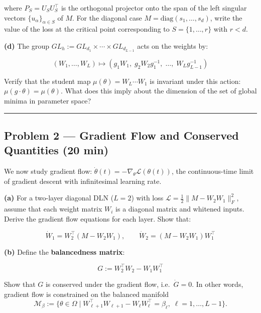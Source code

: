 \documentclass[
]{article}
\begin{document}
where \(P_S = U_S U_S^\top\) is the orthogonal projector onto the span
of the left singular vectors \(\{u_\alpha\}_{\alpha \in S}\) of \(M\).
For the diagonal case \(M = \text{diag}(s_1, \ldots, s_d)\), write the
value of the loss at the critical point corresponding to
\(S = \{1, \ldots, r\}\) with \(r < d\).

\textbf{(d)} The group
\(GL_h := GL_{d_1} \times \cdots \times GL_{d_{L-1}}\) acts on the
weights by:

\[(W_1, \ldots, W_L) \mapsto (g_1 W_1,\; g_2 W_2 g_1^{-1},\; \ldots,\; W_L g_{L-1}^{-1})\]

Verify that the student map \(\mu(\theta) = W_L \cdots W_1\) is
invariant under this action: \(\mu(g \cdot \theta) = \mu(\theta)\). What
does this imply about the dimension of the set of global minima in
parameter space?

\begin{center}\rule{0.5\linewidth}{0.5pt}\end{center}

\subsection{Problem 2 --- Gradient Flow and Conserved Quantities (20
min)}\label{problem-2-gradient-flow-and-conserved-quantities-20-min}

We now study gradient flow:
\(\dot{\theta}(t) = -\nabla_\theta \mathcal{L}(\theta(t))\), the
continuous-time limit of gradient descent with infinitesimal learning
rate.

\textbf{(a)} For a two-layer diagonal DLN (\(L=2\)) with loss
\(\mathcal{L} = \frac{1}{2}\|M - W_2 W_1\|_F^2\), assume that each weight matrix $W_i$ is a diagonal matrix and whitened inputs.
Derive the gradient flow equations for each layer. Show that:

\[\dot{W}_1 = W_2^\top(M - W_2 W_1), \qquad \dot{W}_2 = (M - W_2 W_1) W_1^\top\]

\textbf{(b)} Define the \textbf{balancedness matrix}:

\[G := W_2^\top W_2 - W_1 W_1^\top\]

Show that \(G\) is conserved under the gradient flow,
i.e.~\(\dot{G} = 0\). In other words, gradient flow is constrained on the balanced manifold \begin{equation*}
    \mathcal{M}_{\beta}
    :=
    \{\theta\in\Omega\mid
    W_{\ell+1}^{\top}W_{\ell+1}
    -
    W_{\ell}W_{\ell}^{\top}
    =
    \beta_\ell,\;
    \ell=1,\ldots,L-1\}.
\end{equation*}
\end{document}
